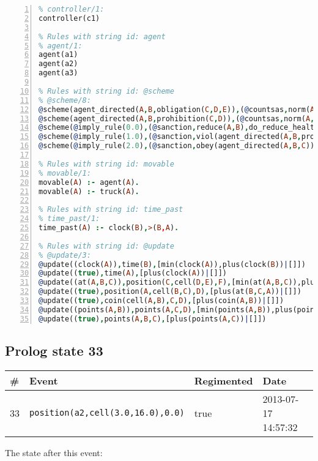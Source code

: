 \documentclass[11pt]{article}\usepackage[utf8]{inputenc}\usepackage{geometry}
\begin{document}
\begin{lstlisting}[language=Prolog, numbers=left]
% Rules with string id: controller
% controller/1:
controller(c1)

% Rules with string id: agent
% agent/1:
agent(a1)
agent(a2)
agent(a3)

% Rules with string id: @scheme
% @scheme/8:
@scheme(agent_directed(A,B,obligation(C,D,E)),(@countsas,norm(A,B,F,obligation(C,D,E)),F),false,(listTrue(C)),(time_past(D)),false,[plus(viol(agent_directed(A,B,obligation(C,D,E))))|[]],[plus(obey(agent_directed(A,B,obligation(C,D,E))))|[]])
@scheme(agent_directed(A,B,prohibition(C,D)),(@countsas,norm(A,B,E,prohibition(C,D)),E),(listTrue(C)),false,(false),false,[plus(viol(agent_directed(A,B,prohibition(C,D))))|[]],[plus(obey(agent_directed(A,B,prohibition(C,D))))|[]])
@scheme(@imply_rule(0.0),(@sanction,reduce(A,B),do_reduce_health(A,B),notifyAgent(A,changed(status))),true,false,false,false,[min(reduce(A,B))|[]],[])
@scheme(@imply_rule(1.0),(@sanction,viol(agent_directed(A,B,prohibition(C,D))),do_sanction(D)),true,false,false,false,[min(viol(agent_directed(A,B,prohibition(C,D))))|[]],[])
@scheme(@imply_rule(2.0),(@sanction,obey(agent_directed(A,B,C))),true,false,false,false,[min(obey(agent_directed(A,B,C)))|[]],[])

% Rules with string id: movable
% movable/1:
movable(A) :- agent(A).
movable(A) :- truck(A).

% Rules with string id: time_past
% time_past/1:
time_past(A) :- clock(B),>(B,A).

% Rules with string id: @update
% @update/3:
@update((clock(A)),time(B),[min(clock(A)),plus(clock(B))|[]])
@update((true),time(A),[plus(clock(A))|[]])
@update((at(A,B,C)),position(C,cell(D,E),F),[min(at(A,B,C)),plus(at(D,E,C))|[]])
@update((true),position(A,cell(B,C),D),[plus(at(B,C,A))|[]])
@update((true),coin(cell(A,B),C,D),[plus(coin(A,B))|[]])
@update((points(A,B)),points(A,C,D),[min(points(A,B)),plus(points(A,D))|[]])
@update((true),points(A,B,C),[plus(points(A,C))|[]])

\end{lstlisting}
\clearpage 
\subsection{Prolog state 33}
\begin{table}[ht]
\centering 
\begin{tabular}{l l l l} 
\textbf{\#} & \textbf{Event} & \textbf{Regimented} & \textbf{Date} \\ [0.5ex] 
\hline
33&\texttt{position(a2,cell(3.0,16.0),0.0)}&true&2013-07-17 14:57:32\\ [1ex] \hline\end{tabular}
\end{table}
The state after this event:
\end{document}
